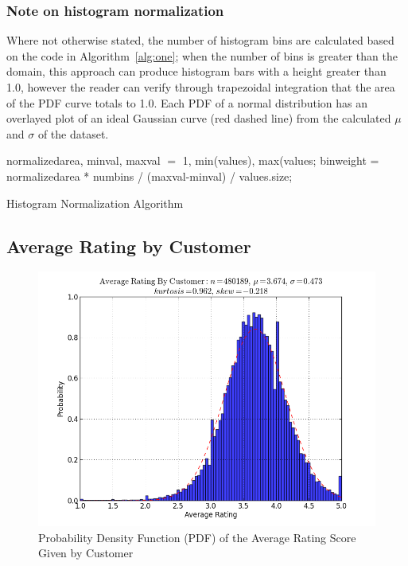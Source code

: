 \documentclass[prodmode,acmtecs]{acmsmall}
\begin{document}
\subsubsection{Note on histogram normalization}Where not otherwise stated, the number of histogram bins are calculated based on the code in Algorithm~\ref{alg:one}; when the number of bins is greater than the domain, this approach can produce histogram bars with a height greater than 1.0, however the reader can verify through trapezoidal integration that the area of the PDF curve totals to 1.0. Each PDF of a normal distribution has an overlayed plot of an ideal Gaussian curve (red dashed line) from the calculated $\mu$ and $\sigma$ of the dataset.

\begin{algorithm}[t]
\SetAlgoNoLine
{}
normalizedarea, minval, maxval $=$ 1, min(values), max(values; \newline
binweight = normalizedarea * numbins / (maxval-minval) / values.size; \newline
\caption{Histogram Normalization Algorithm}
\label{alg:one}
\end{algorithm}

\subsection{Average Rating by Customer}

\begin{figure}
\centerline{\includegraphics[scale=.6]{average_rating_by_customer.png}}
\caption{Probability Density Function (PDF) of the Average Rating Score Given by Customer}
\label{fig:three}
\end{figure}
\end{document}
